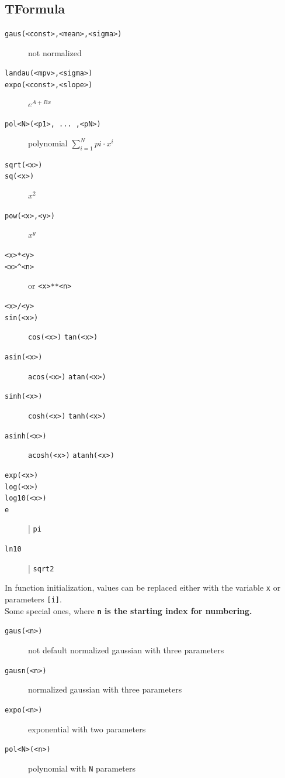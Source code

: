 \documentclass[10pt, twoside]{article}
\newcommand{\ttt}[1]{\colorbox{boxgray}{\texttt{#1}}}
\begin{document}
\subsection*{TFormula}
\begin{description}
\item[\ttt{gaus(<const>,<mean>,<sigma>)}] not normalized
\item[\ttt{landau(<mpv>,<sigma>)}]
\item[\ttt{expo(<const>,<slope>)}] $\displaystyle e^{A + Bx}$
\item[\ttt{pol<N>(<p1>, ... ,<pN>)}] polynomial $\displaystyle \sum_{i=1}^N pi \cdot x^i$ 
\item[\ttt{sqrt(<x>)}]
\item[\ttt{sq(<x>)}] $x^2$
\item[\ttt{pow(<x>,<y>)}] $x^y$
\item[\ttt{<x>*<y>}]
\item[\ttt{<x>\textasciicircum <n>}] or \ttt{<x>**<n>}
\item[\ttt{<x>/<y>}]
\item[\ttt{sin(<x>)}] \ttt{cos(<x>)} \ttt{tan(<x>)}
\item[\ttt{asin(<x>)}] \ttt{acos(<x>)} \ttt{atan(<x>)}
\item[\ttt{sinh(<x>)}] \ttt{cosh(<x>)} \ttt{tanh(<x>)}
\item[\ttt{asinh(<x>)}] \ttt{acosh(<x>)} \ttt{atanh(<x>)}
\item[\ttt{exp(<x>)}]
\item[\ttt{log(<x>)}]
\item[\ttt{log10(<x>)}]
\item[\ttt{e}] \quad \big| \quad \ttt{pi}
\item[\ttt{ln10}] \quad \big| \quad \ttt{sqrt2}
\end{description}
In function initialization, values can be replaced either with the variable \ttt{x} or parameters \ttt{[i]}.\\
Some special ones, where \textbf{\ttt{n} is the starting index for numbering.}
\begin{description}
\item[\ttt{gaus(<n>)}] not default normalized gaussian with three parameters
\item[\ttt{gausn(<n>)}] normalized gaussian with three parameters
\item[\ttt{expo(<n>)}] exponential with two parameters
\item[\ttt{pol<N>(<n>)}] polynomial with \ttt{N} parameters
\end{description}
\end{document}
